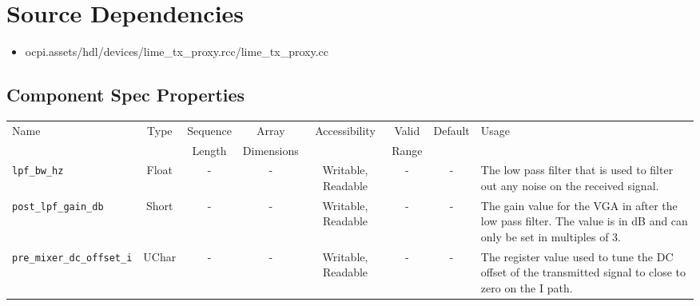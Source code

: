 \documentclass{article}
\begin{document}
\section*{Source Dependencies}
\begin{itemize}
	\item ocpi.assets/hdl/devices/lime\_tx\_proxy.rcc/lime\_tx\_proxy.cc
\end{itemize}

\begin{landscape}
	\section*{Component Spec Properties}
	\begin{scriptsize}
		\begin{tabular}{|p{3cm}|c|c|c|c|c|c|p{10cm}|}
			\hline
			\rowcolor{blue}
			Name                         & Type   & Sequence & Array      & Accessibility       & Valid & Default & Usage                                                                                                                                                                                                                       \\
			\rowcolor{blue}
			                             &        & Length   & Dimensions &                     & Range &         &                                                                                                                                                                                                                             \\
			\hline
			\verb+lpf_bw_hz+             & Float  & -        & -          & Writable, Readable  & -     & -       & The low pass filter that is used to filter out any noise on the received signal.                                                                                                                                            \\
			\hline
			\verb+post_lpf_gain_db+      & Short  & -        & -          & Writable, Readable  & -     & -       & The gain value for the VGA in after the low pass filter. The value is in dB and can only be set in multiples of 3.                                                                                                          \\
			\hline
			\verb+pre_mixer_dc_offset_i+ & UChar  & -        & -          & Writable, Readable  & -     & -       & The register value used to tune the DC offset of the transmitted signal to close to zero on the I path.                                                                                                                     \\

\end{tabular}
\end{scriptsize}
\end{landscape}
\end{document}
